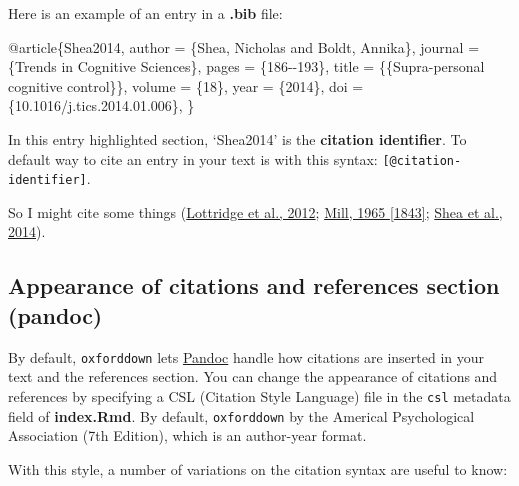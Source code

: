 \documentclass[a4paper, nobind]{templates/ociamthesis}
\newenvironment{Shaded}{\begin{snugshade}}{\end{snugshade}}
\newcommand{\DataTypeTok}[1]{\textcolor[rgb]{0.13,0.29,0.53}{#1}}
\newcommand{\NormalTok}[1]{#1}
\newcommand{\OtherTok}[1]{\textcolor[rgb]{0.56,0.35,0.01}{#1}}
\newcommand{\VariableTok}[1]{\textcolor[rgb]{0.00,0.00,0.00}{#1}}
\renewenvironment{Shaded}
{
  \vspace{10pt}%
  \begin{snugshade}%
}{%
  \end{snugshade}%
  \vspace{8pt}%
}
\begin{document}
Here is an example of an entry in a \textbf{.bib} file:

\begin{Shaded}
\begin{Highlighting}[]
\VariableTok{@article}\NormalTok{\{}\OtherTok{Shea2014}\NormalTok{,}
  \DataTypeTok{author}\NormalTok{ =        \{Shea, Nicholas and Boldt, Annika\},}
  \DataTypeTok{journal}\NormalTok{ =       \{Trends in Cognitive Sciences\},}
  \DataTypeTok{pages}\NormalTok{ =         \{186{-}{-}193\},}
  \DataTypeTok{title}\NormalTok{ =         \{\{Supra{-}personal cognitive control\}\},}
  \DataTypeTok{volume}\NormalTok{ =        \{18\},}
  \DataTypeTok{year}\NormalTok{ =          \{2014\},}
  \DataTypeTok{doi}\NormalTok{ =           \{10.1016/j.tics.2014.01.006\},}
\NormalTok{\}}
\end{Highlighting}
\end{Shaded}

In this entry highlighted section, `Shea2014' is the \textbf{citation identifier}.
To default way to cite an entry in your text is with this syntax: \texttt{{[}@citation-identifier{]}}.

So I might cite some things (\protect\hyperlink{ref-Lottridge2012}{Lottridge et al., 2012}; \protect\hyperlink{ref-Mill1965}{Mill, 1965 {[}1843{]}}; \protect\hyperlink{ref-Shea2014}{Shea et al., 2014}).

\hypertarget{citation-appearance}{%
\subsection{Appearance of citations and references section (pandoc)}\label{citation-appearance}}

By default, \texttt{oxforddown} lets \href{https://pandoc.org}{Pandoc} handle how citations are inserted in your text and the references section.
You can change the appearance of citations and references by specifying a CSL (Citation Style Language) file in the \texttt{csl} metadata field of \textbf{index.Rmd}.
By default, \texttt{oxforddown} by the Americal Psychological Association (7th Edition), which is an author-year format.

With this style, a number of variations on the citation syntax are useful to know:
\end{document}
